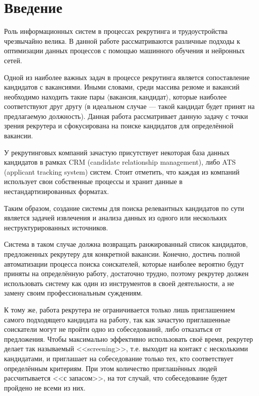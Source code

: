 \documentclass[14pt]{mmcs_article}
\begin{document}

\renewcommand{\contentsname}{Оглавление}

\tableofcontents

\newpage
\section*{Введение}

Роль информационных систем в процессах рекрутинга и трудоустройства чрезвычайно велика.
В данной работе рассматриваются различные подходы к оптимизации данных процессов с помощью машинного обучения и нейронных сетей.

Одной из наиболее важных задач в процессе рекрутинга является сопоставление кандидатов с вакансиями. Иными словами, среди массива резюме и вакансий необходимо находить такие пары $\langle\text{вакансия},\text{кандидат}\rangle$, которые наиболее соответствуют друг другу (в идеальном случае --- такой кандидат будет принят на предлагаемую должность).
Данная работа рассматривает данную задачу с точки зрения рекрутера и сфокусирована на поиске кандидатов для определённой вакансии.

У рекрутинговых компаний зачастую присутствует некоторая база данных кандидатов в рамках CRM (candidate relationship management), либо ATS (applicant tracking system) систем.
Стоит отметить, что каждая из компаний использует свои собственные процессы и хранит данные в нестандартизированных форматах.

Таким образом, создание системы для поиска релевантных кандидатов по сути является задачей извлечения и анализа данных из одного или нескольких неструктурированных источников.

Система в таком случае должна возвращать ранжированный список кандидатов, предложенных рекрутеру для конкретной вакансии. Конечно, достичь полной автоматизации процесса поиска соискателей, которые наиболее вероятно будут приняты на определённую работу, достаточно трудно, поэтому рекрутер должен использовать систему как один из инструментов в своей деятельности, а не замену своим профессиональным суждениям.

К тому же, работа рекрутера не ограничивается только лишь приглашением самого подходящего кандидата на работу, так как зачастую приглашенные соискатели могут не пройти одно из собеседований, либо отказаться от предложения. Чтобы максимально эффективно использовать своё время, рекрутер делает так называемый <<screening>>, т.е. выходит на контакт с несколькими кандидатами, и приглашает на собеседование только тех, кто соответствует определённым критериям. При этом количество приглашённых людей рассчитывается <<с запасом>>, на тот случай, что собеседование будет пройдено не всеми из них.
\end{document}
